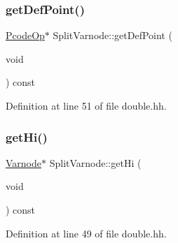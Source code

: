 \subsubsection{\texorpdfstring{getDefPoint()}{getDefPoint()}}
{\footnotesize\ttfamily \mbox{\hyperlink{class_pcode_op}{Pcode\+Op}}$\ast$ Split\+Varnode\+::get\+Def\+Point (\begin{DoxyParamCaption}\item[{void}]{ }\end{DoxyParamCaption}) const\hspace{0.3cm}{\ttfamily [inline]}}



Definition at line 51 of file double.\+hh.

\mbox{\label{class_split_varnode_ac42eae2b9f25ba620f3741661b91f5d6}} 
\subsubsection{\texorpdfstring{getHi()}{getHi()}}
{\footnotesize\ttfamily \mbox{\hyperlink{class_varnode}{Varnode}}$\ast$ Split\+Varnode\+::get\+Hi (\begin{DoxyParamCaption}\item[{void}]{ }\end{DoxyParamCaption}) const\hspace{0.3cm}{\ttfamily [inline]}}



Definition at line 49 of file double.\+hh.

